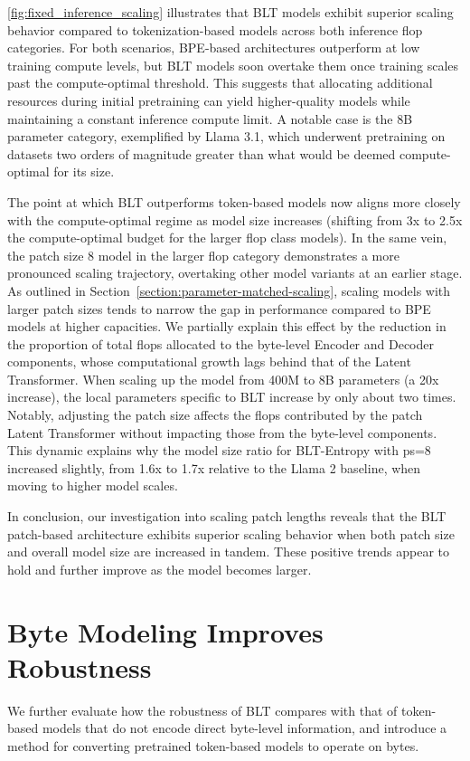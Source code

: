 \autoref{fig:fixed_inference_scaling} illustrates that {\textsc BLT} models exhibit superior scaling behavior compared to tokenization-based models across both inference flop categories. For both scenarios, BPE-based architectures outperform at low training compute levels, but {\textsc BLT} models soon overtake them once training scales past the compute-optimal threshold. This suggests that allocating additional resources during initial pretraining can yield higher-quality models while maintaining a constant inference compute limit. A notable case is the 8B parameter category, exemplified by Llama 3.1, which underwent pretraining on datasets two orders of magnitude greater than what would be deemed compute-optimal for its size.

The point at which {\textsc BLT} outperforms token-based models now aligns more closely with the compute-optimal regime as model size increases (shifting from 3x to 2.5x the compute-optimal budget for the larger flop class models). In the same vein, the patch size 8 model in the larger flop category demonstrates a more pronounced scaling trajectory, overtaking other model variants at an earlier stage. As outlined in Section~\ref{section:parameter-matched-scaling}, scaling models with larger patch sizes tends to narrow the gap in performance compared to BPE models at higher capacities. We partially explain this effect by the reduction in the proportion of total flops allocated to the byte-level Encoder and Decoder components, whose computational growth lags behind that of the Latent Transformer. When scaling up the model from 400M to 8B parameters (a 20x increase), the local parameters specific to {\textsc BLT} increase by only about two times. Notably, adjusting the patch size affects the flops contributed by the patch Latent Transformer without impacting those from the byte-level components. This dynamic explains why the model size ratio for {\textsc BLT}-Entropy with ps=8 increased slightly, from 1.6x to 1.7x relative to the Llama 2 baseline, when moving to higher model scales.

In conclusion, our investigation into scaling patch lengths reveals that the {\textsc BLT} patch-based architecture exhibits superior scaling behavior when both patch size and overall model size are increased in tandem. These positive trends appear to hold and further improve as the model becomes larger.

\section{Byte Modeling Improves Robustness} We further evaluate how the robustness of {\textsc BLT} compares with that of token-based models that do not encode direct byte-level information, and introduce a method for converting pretrained token-based models to operate on bytes. 
\label{sec:robustness}

